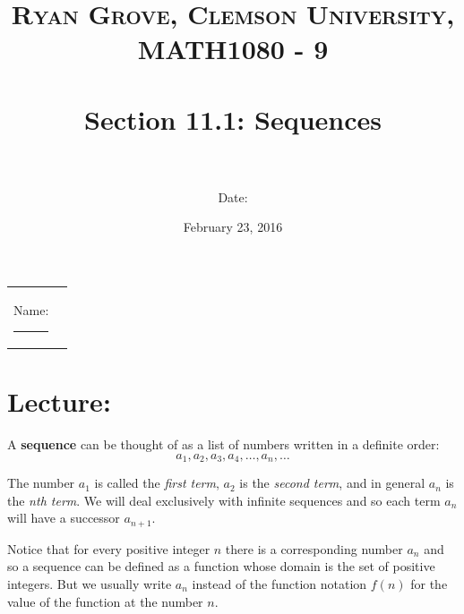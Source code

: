 \documentclass[paper=a4, fontsize=11pt]{scrartcl} %
\title{	
\normalfont \normalsize 
\textsc{Ryan Grove, Clemson University, MATH1080 - 9} \\ [25pt] %
\horrule{0.5pt} \\[0.4cm] %
\huge Section 11.1: Sequences \\ %
\horrule{2pt} \\[0.5cm] %
}
\author{Date:} %
\date{\normalsize February 23, 2016} %
\numberwithin{equation}{section} %
\numberwithin{figure}{section} %
\numberwithin{table}{section} %
\begin{document}
\maketitle %

\begin{flushleft}
\begin{tabular}{l l}
Name: \rule{3.2in}{.01cm}  & {}%
\end{tabular}
\end{flushleft}


\section*{\textbf{Lecture:}}
A \textbf{sequence} can be thought of as a list of numbers written in a definite order:
\[a_1,a_2,a_3,a_4,\ldots,a_n,\ldots\]

The number $a_1$ is called the \textit{first term}, $a_2$ is the \textit{second term}, and in general $a_n$ is the \textit{nth term}. We will deal exclusively with infinite sequences and so each term $a_n$ will have a successor $a_{n+1}$.\\
\indent

Notice that for every positive integer $n$ there is a corresponding number $a_n$ and so a sequence can be defined as a function whose domain is the set of positive integers. But we usually write $a_n$ instead of the function notation $f(n)$ for the value of the function at the number $n$.\\
\indent

  \indent\\
  \indent
  
\end{document}
